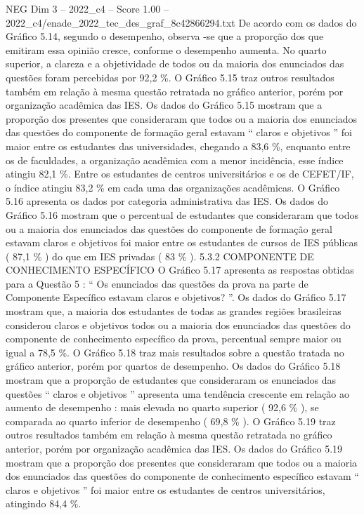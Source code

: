\begin{textsample}{NEG Dim 3 – 2022\_c4 – Score 1.00 – 2022\_c4/enade\_2022\_tec\_des\_graf\_8c42866294.txt}
De acordo com os dados do Gráfico 5.14, segundo o desempenho, observa -se que a proporção dos que emitiram essa opinião cresce, conforme o desempenho aumenta.
No quarto superior, a clareza e a objetividade de todos ou da maioria dos enunciados das questões foram percebidas por 92,2 \%.
O Gráfico 5.15 traz outros resultados também em relação à mesma questão retratada no gráfico anterior, porém por organização acadêmica das IES.
Os dados do Gráfico 5.15 mostram que a proporção dos presentes que consideraram que todos ou a maioria dos enunciados das questões do componente de formação geral estavam “ claros e objetivos ” foi maior entre os estudantes das universidades, chegando a 83,6 \%, enquanto entre os de faculdades, a organização acadêmica com a menor incidência, esse índice atingiu 82,1 \%.
Entre os estudantes de centros universitários e os de CEFET/IF, o índice atingiu 83,2 \% em cada uma das organizações acadêmicas.
O Gráfico 5.16 apresenta os dados por categoria administrativa das IES.
Os dados do Gráfico 5.16 mostram que o percentual de estudantes que consideraram que todos ou a maioria dos enunciados das questões do componente de formação geral estavam claros e objetivos foi maior entre os estudantes de cursos de IES públicas ( 87,1 \% ) do que em IES privadas ( 83 \% ). 5.3.2 COMPONENTE DE CONHECIMENTO ESPECÍFICO O Gráfico 5.17 apresenta as respostas obtidas para a Questão 5 : “ Os enunciados das questões da prova na parte de Componente Específico estavam claros e objetivos? ”.
Os dados do Gráfico 5.17 mostram que, a maioria dos estudantes de todas as grandes regiões brasileiras considerou claros e objetivos todos ou a maioria dos enunciados das questões do componente de conhecimento específico da prova, percentual sempre maior ou igual a 78,5 \%.
O Gráfico 5.18 traz mais resultados sobre a questão tratada no gráfico anterior, porém por quartos de desempenho.
Os dados do Gráfico 5.18 mostram que a proporção de estudantes que consideraram os enunciados das questões “ claros e objetivos ” apresenta uma tendência crescente em relação ao aumento de desempenho : mais elevada no quarto superior ( 92,6 \% ), se comparada ao quarto inferior de desempenho ( 69,8 \% ).
O Gráfico 5.19 traz outros resultados também em relação à mesma questão retratada no gráfico anterior, porém por organização acadêmica das IES.
Os dados do Gráfico 5.19 mostram que a proporção dos presentes que consideraram que todos ou a maioria dos enunciados das questões do componente de conhecimento específico estavam “ claros e objetivos ” foi maior entre os estudantes de centros universitários, atingindo 84,4 \%.

\end{textsample}
